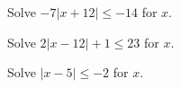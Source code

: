 \newpage

\begin{exercise}
Solve $-7\vert x+12\vert\leq-14$ for $x$.
\end{exercise}
\begin{solution}[2in]

\end{solution}
\vspace{0.5em}

\begin{exercise}
Solve $2\vert x-12\vert+1\leq23$ for $x$.
\end{exercise}
\begin{solution}[2in]

\end{solution}

\begin{exercise}
Solve $\vert x-5\vert\leq-2$ for $x$.
\end{exercise}
\begin{solution}[2in]

\end{solution}
\vspace{0.5em}